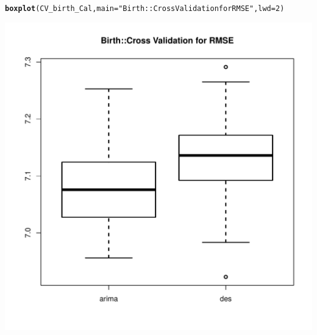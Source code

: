 \documentclass[10pt]{article}\usepackage[]{graphicx}\usepackage[]{color}
\makeatletter
\def\maxwidth{ %
  \ifdim\Gin@nat@width>\linewidth
    \linewidth
  \else
    \Gin@nat@width
  \fi
}
\newcommand{\hlnum}[1]{\textcolor[rgb]{0.686,0.059,0.569}{#1}}%
\newcommand{\hlstr}[1]{\textcolor[rgb]{0.192,0.494,0.8}{#1}}%
\newcommand{\hlstd}[1]{\textcolor[rgb]{0.345,0.345,0.345}{#1}}%
\newcommand{\hlkwc}[1]{\textcolor[rgb]{0.333,0.667,0.333}{#1}}%
\newcommand{\hlkwd}[1]{\textcolor[rgb]{0.737,0.353,0.396}{\textbf{#1}}}%
\newenvironment{kframe}{%
 \def\at@end@of@kframe{}%
 \ifinner\ifhmode%
  \def\at@end@of@kframe{\end{minipage}}%
  \begin{minipage}{\columnwidth}%
 \fi\fi%
 \def\FrameCommand##1{\hskip\@totalleftmargin \hskip-\fboxsep
 \colorbox{shadecolor}{##1}\hskip-\fboxsep
     \hskip-\linewidth \hskip-\@totalleftmargin \hskip\columnwidth}%
 \MakeFramed {\advance\hsize-\width
   \@totalleftmargin\z@ \linewidth\hsize
   \@setminipage}}%
 {\par\unskip\endMakeFramed%
 \at@end@of@kframe}
\newenvironment{knitrout}{}{} %
\makeatother
\begin{document}
\begin{knitrout}
\begin{kframe}
\begin{alltt}
\hlkwd{boxplot}\hlstd{(CV_birth_Cal,}\hlkwc{main} \hlstd{=} \hlstr{"Birth::Cross Validation for RMSE"}\hlstd{,} \hlkwc{lwd}\hlstd{=}\hlnum{2}\hlstd{)}
\end{alltt}
\end{kframe}
\includegraphics[width=\maxwidth]{figure/unnamed-chunk-14-1} 

\end{knitrout}
\end{document}
